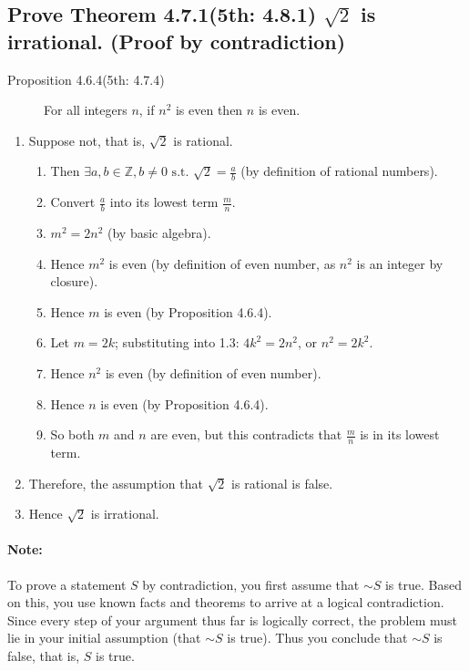 \documentclass{article}
\begin{document}
\subsection*{Prove Theorem 4.7.1(5th: 4.8.1) $\sqrt{2}$ is irrational. (Proof by contradiction)}
\begin{description}
    \item[Proposition 4.6.4(5th: 4.7.4)] For all integers $n$, if $n^2$ is even then $n$ is even.
\end{description}
\begin{enumerate}
    \item Suppose not, that is, $\sqrt{2}$ is rational.
    \begin{enumerate}
        \item Then $\exists{a},b\in\mathbb{Z},b\neq0\text{ s.t. }\sqrt{2}=\frac{a}{b}$ (by definition of rational numbers).
        \item Convert $\frac{a}{b}$ into its lowest term $\frac{m}{n}$.
        \item $m^2=2n^2$ (by basic algebra).
        \item Hence $m^2$ is even (by definition of even number, as $n^2$ is an integer by closure).
        \item Hence $m$ is even (by Proposition 4.6.4).
        \item Let $m=2k$; substituting into 1.3: $4k^2=2n^2$, or $n^2=2k^2$.
        \item Hence $n^2$ is even (by definition of even number).
        \item Hence $n$ is even (by Proposition 4.6.4).
        \item So both $m$ and $n$ are even, but this contradicts that $\frac{m}{n}$ is in its lowest term.
    \end{enumerate}
    \item Therefore, the assumption that $\sqrt{2}$ is rational is false. 
    \item Hence $\sqrt{2}$ is irrational. 
\end{enumerate}
\paragraph{Note:}To prove a statement $S$ by contradiction, you first assume that ${\sim}{S}$ is true. Based on this, you use known facts and theorems to arrive at a logical contradiction. Since every step of your argument thus far is logically correct, the problem must lie in your initial assumption (that ${\sim}{S}$ is true). Thus you conclude that ${\sim}{S}$ is false, that is, $S$ is true.
\vspace{0.1cm}
\end{document}
